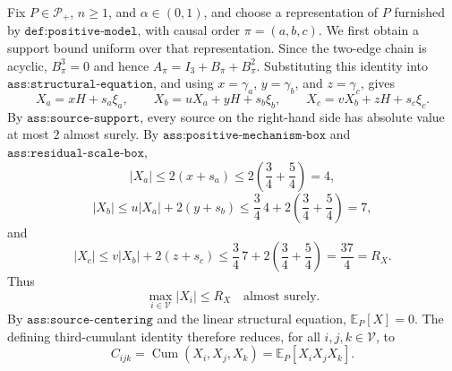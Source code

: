 Fix \(P\in\mathcal P_+\), \(n\geq1\), and \(\alpha\in(0,1)\), and choose a representation of \(P\) furnished by \(\texttt{def:positive-model}\), with causal order \(\pi=(a,b,c)\).  We first obtain a support bound uniform over that representation.  Since the two-edge chain is acyclic, \(B_\pi^3=0\) and hence \(A_\pi=I_3+B_\pi+B_\pi^2\).  Substituting this identity into \(\texttt{ass:structural-equation}\), and using \(x=\gamma_a\), \(y=\gamma_b\), and \(z=\gamma_c\), gives
\[
 X_a=xH+s_a\xi_a,
 \qquad
 X_b=uX_a+yH+s_b\xi_b,
 \qquad
 X_c=vX_b+zH+s_c\xi_c.
\]
By \(\texttt{ass:source-support}\), every source on the right-hand side has absolute value at most \(2\) almost surely.  By \(\texttt{ass:positive-mechanism-box}\) and \(\texttt{ass:residual-scale-box}\),
\[
 |X_a|
 \leq 2(x+s_a)
 \leq2\left(\frac34+\frac54\right)=4,
\]
\[
 |X_b|
 \leq u|X_a|+2(y+s_b)
 \leq\frac34\,4+2\left(\frac34+\frac54\right)=7,
\]
and
\[
 |X_c|
 \leq v|X_b|+2(z+s_c)
 \leq\frac34\,7+2\left(\frac34+\frac54\right)
 =\frac{37}{4}=R_X.
\]
Thus
\[
 \max_{i\in\mathcal V}|X_i|\leq R_X
 \quad\text{almost surely}.                                      \tag{1}
\]
By \(\texttt{ass:source-centering}\) and the linear structural equation, \(\mathbb E_P[X]=0\).  The defining third-cumulant identity therefore reduces, for all \(i,j,k\in\mathcal V\), to
\[
 C_{ijk}=\operatorname{Cum}(X_i,X_j,X_k)
 =\mathbb E_P[X_iX_jX_k].                                         \tag{2}
\]

